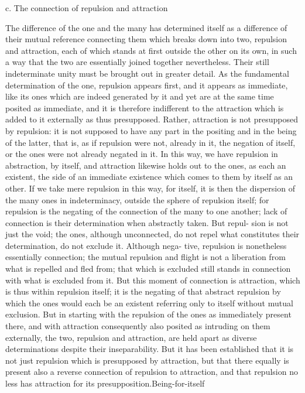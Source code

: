 c. The connection of repulsion and attraction

The difference of the one and the many has determined itself as a difference
of their mutual reference connecting them which breaks down into two,
repulsion and attraction, each of which stands at first outside the other
on its own, in such a way that the two are essentially joined together
nevertheless. Their still indeterminate unity must be brought out in greater
detail.
As the fundamental determination of the one, repulsion appears first, and
it appears as immediate, like its ones which are indeed generated by it and
yet are at the same time posited as immediate, and it is therefore indifferent
to the attraction which is added to it externally as thus presupposed. Rather,
attraction is not presupposed by repulsion: it is not supposed to have any
part in the positing and in the being of the latter, that is, as if repulsion
were not, already in it, the negation of itself, or the ones were not already
negated in it. In this way, we have repulsion in abstraction, by itself, and
attraction likewise holds out to the ones, as each an existent, the side of an
immediate existence which comes to them by itself as an other.
If we take mere repulsion in this way, for itself, it is then the dispersion
of the many ones in indeterminacy, outside the sphere of repulsion itself;
for repulsion is the negating of the connection of the many to one another;
lack of connection is their determination when abstractly taken. But repul-
sion is not just the void; the ones, although unconnected, do not repel
what constitutes their determination, do not exclude it. Although nega-
tive, repulsion is nonetheless essentially connection; the mutual repulsion
and flight is not a liberation from what is repelled and fled from; that which
is excluded still stands in connection with what is excluded from it. But this
moment of connection is attraction, which is thus within repulsion itself;
it is the negating of that abstract repulsion by which the ones would each
be an existent referring only to itself without mutual exclusion.
But in starting with the repulsion of the ones as immediately present
there, and with attraction consequently also posited as intruding on them
externally, the two, repulsion and attraction, are held apart as diverse
determinations despite their inseparability. But it has been established that
it is not just repulsion which is presupposed by attraction, but that there
equally is present also a reverse connection of repulsion to attraction, and
that repulsion no less has attraction for its presupposition.Being-for-itself
